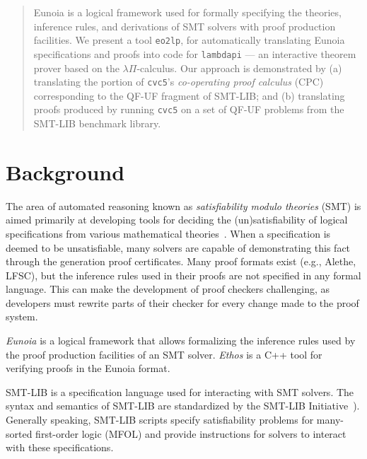 



\maketitle

\begin{abstract}
	\noindent
	Eunoia is a logical framework used for formally specifying the
	theories, inference rules, and derivations of SMT solvers with
	proof production facilities.
	We present a tool \texttt{eo2lp}, for automatically translating Eunoia
	specifications and proofs into code for \texttt{lambdapi} ---
	an interactive theorem prover based on the $\lambda\Pi$-calculus.
	Our approach is demonstrated by
	(a) translating the portion of \texttt{cvc5}'s
	\textit{co-operating proof calculus} (CPC) corresponding to the QF-UF
	fragment of SMT-LIB; and
	(b) translating proofs produced by running \texttt{cvc5} on a set of
	QF-UF problems from the SMT-LIB benchmark library.
\end{abstract}

\section{Background}

The area of automated reasoning known as \emph{satisfiability modulo theories}
(SMT) is aimed primarily at developing tools for deciding the (un)satisfiability
of logical specifications from various mathematical theories~\cite{Barrett2021}.
%
When a specification is deemed to be unsatisfiable, many solvers are capable
of demonstrating this fact through the generation proof certificates.
%
Many proof formats exist (e.g., Alethe, LFSC), but the inference rules used
in their proofs are not specified in any formal language.
%
This can make the development of proof checkers challenging, as developers
must rewrite parts of their checker for every change made to the proof system.

\textit{Eunoia} is a logical framework that allows formalizing the inference
rules used by the proof production facilities of an SMT solver.
%
\textit{Ethos} is a C++ tool for verifying proofs in the Eunoia format.

SMT-LIB is a specification language used for interacting with SMT solvers.
The syntax and semantics of SMT-LIB are standardized by the
SMT-LIB Initiative~\autocite{Barrett2015-standard}).
%
Generally speaking, SMT-LIB scripts specify satisfiability problems for
many-sorted first-order logic (MFOL) and provide instructions for solvers
to interact with these specifications.


